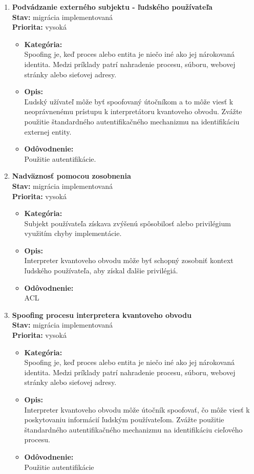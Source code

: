 \begin{enumerate}
\item \textbf{Podvádzanie externého subjektu - ľudského používateľa} \\
\textbf{Stav:} migrácia implementovaná \\
\textbf{Priorita:} vysoká 

\begin{itemize}
\item[] \textbf{Kategória:} \\
Spoofing je, keď proces alebo entita je niečo iné ako jej nárokovaná identita. Medzi príklady patrí nahradenie procesu, súboru, webovej stránky alebo sieťovej adresy.
\item[] \textbf{Opis:} \\
Ľudský užívateľ môže byť spoofovaný útočníkom a to môže viesť k neoprávnenému prístupu k interpretátoru kvantoveho obvodu. Zvážte použitie štandardného autentifikačného mechanizmu na identifikáciu externej entity.
\item[] \textbf{Odôvodnenie:} \\
Použitie autentifikácie.
\end{itemize}

\item \textbf{Nadväznosť pomocou zosobnenia} \\
\textbf{Stav:} migrácia implementovaná \\
\textbf{Priorita:} vysoká

\begin{itemize}
\item[] \textbf{Kategória:} \\
Subjekt používateľa získava zvýšenú spôsobilosť alebo privilégium využitím chyby implementácie.
\item[] \textbf{Opis:} \\
Interpreter kvantoveho  obvodu môže byť schopný zosobniť kontext ľudského používateľa, aby získal ďalšie privilégiá.
\item[] \textbf{Odôvodnenie:} \\
ACL
\end{itemize}

\item \textbf{Spoofing procesu interpretera kvantoveho obvodu} \\
\textbf{Stav:} migrácia implementovaná \\
\textbf{Priorita:} vysoká

\begin{itemize}
\item[] \textbf{Kategória:} \\
Spoofing je, keď proces alebo entita je niečo iné ako jej nárokovaná identita. Medzi príklady patrí nahradenie procesu, súboru, webovej stránky alebo sieťovej adresy.
\item[] \textbf{Opis:} \\
Interpreter kvantoveho obvodu môže útočník spoofovať, čo môže viesť k poskytovaniu informácií ľudským používateľom. Zvážte použitie štandardného autentifikačného mechanizmu na identifikáciu cieľového procesu.
\item[] \textbf{Odôvodnenie:} \\
Použitie autentifikácie
\end{itemize}


\end{enumerate}
